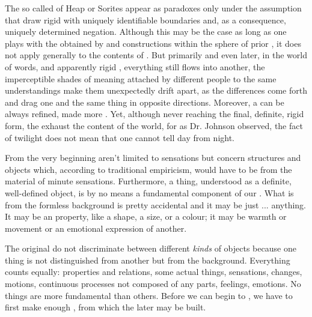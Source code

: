 The so called  of Heap or Sorites  appear as
paradoxes only under the assumption that  draw rigid
 with uniquely identifiable boundaries and, as a consequence,
uniquely determined negation. Although this may be the case as long as one
plays with the  obtained by  and constructions
within the sphere of prior , it does not apply
  generally to 
the contents of .  But primarily  and even later, in the
world of words,  and apparently rigid , everything
still flows into another, the imperceptible shades of meaning attached by
different people to the same understandings make them unexpectedly drift apart,
as the differences come forth and drag one and the same thing in opposite
directions.  Moreover, a  can be always refined, made more
. Yet, although never reaching the final, definite, rigid form, the
 exhaust the content of the world, for as Dr. Johnson observed,
the fact of twilight does not mean that one cannot tell day from night.


\pa From the very beginning  aren't limited to sensations but
concern structures and objects which, according to traditional empiricism, would
have to be  from the material of minute sensations.  Furthermore,
a {thing}, understood as a definite, well-defined object, is by no means a
fundamental component of our . What is  from the
formless background is pretty accidental and it may be just ... anything.  It
may be an  property, like a shape, a size, or a colour; it may be
warmth or movement or an emotional expression of another. 

The original  do not discriminate between different {\em kinds}
of objects because one thing is not distinguished from another but from the
background. Everything counts equally: properties and relations, some actual
{things}, sensations, changes, motions, continuous processes not composed of
any parts, feelings, emotions.  No things are more fundamental than others.
Before we can begin to , we have to first make enough
, from which the later  may be built.

